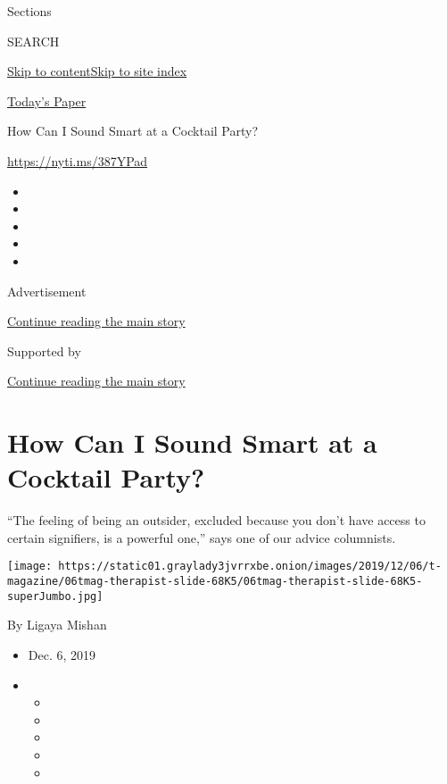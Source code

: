 Sections

SEARCH

\protect\hyperlink{site-content}{Skip to
content}\protect\hyperlink{site-index}{Skip to site index}

\href{https://myaccount.nytimes3xbfgragh.onion/auth/login?response_type=cookie\&client_id=vi}{}

\href{https://www.nytimes3xbfgragh.onion/section/todayspaper}{Today's
Paper}

How Can I Sound Smart at a Cocktail Party?

\url{https://nyti.ms/387YPad}

\begin{itemize}
\item
\item
\item
\item
\item
\end{itemize}

Advertisement

\protect\hyperlink{after-top}{Continue reading the main story}

Supported by

\protect\hyperlink{after-sponsor}{Continue reading the main story}

\hypertarget{how-can-i-sound-smart-at-a-cocktail-party}{%
\section{How Can I Sound Smart at a Cocktail
Party?}\label{how-can-i-sound-smart-at-a-cocktail-party}}

``The feeling of being an outsider, excluded because you don't have
access to certain signifiers, is a powerful one,'' says one of our
advice columnists.

\texttt{[image: https://static01.graylady3jvrrxbe.onion/images/2019/12/06/t-magazine/06tmag-therapist-slide-68K5/06tmag-therapist-slide-68K5-superJumbo.jpg]}

By Ligaya Mishan

\begin{itemize}
\item
  Dec. 6, 2019
\item
  \begin{itemize}
  \item
  \item
  \item
  \item
  \item
  \end{itemize}
\end{itemize}

